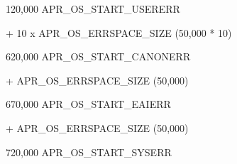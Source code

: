 \begin{DoxyPre}120,000      APR\_OS\_START\_USERERR
\begin{DoxyVerb}    + 10 x APR_OS_ERRSPACE_SIZE (50,000 * 10)
\end{DoxyVerb}
\end{DoxyPre}



\begin{DoxyPre}620,000      APR\_OS\_START\_CANONERR
\begin{DoxyVerb}    + APR_OS_ERRSPACE_SIZE (50,000)
\end{DoxyVerb}
\end{DoxyPre}



\begin{DoxyPre}670,000      APR\_OS\_START\_EAIERR
\begin{DoxyVerb}    + APR_OS_ERRSPACE_SIZE (50,000)
\end{DoxyVerb}
\end{DoxyPre}



\begin{DoxyPre}720,000      APR\_OS\_START\_SYSERR\end{DoxyPre}



\begin{DoxyPre}\end{DoxyPre}
 